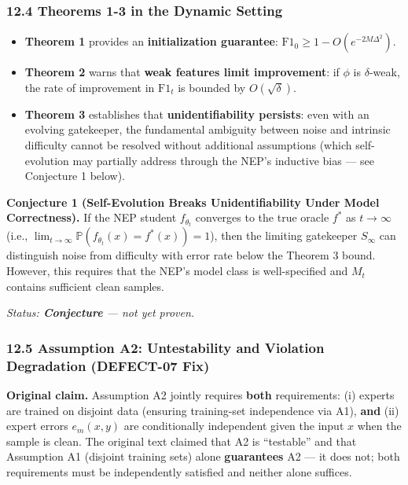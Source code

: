 \documentclass[
  12pt,
]{article}
\providecommand{\tightlist}{%
  \setlength{\itemsep}{0pt}\setlength{\parskip}{0pt}}
\begin{document}
\subsubsection{12.4 Theorems 1-3 in the Dynamic
Setting}\label{theorems-1-3-in-the-dynamic-setting}

\begin{itemize}
\tightlist
\item
  \textbf{Theorem 1} provides an \textbf{initialization guarantee}:
  \(\text{F1}_0 \geq 1 - O(e^{-2M\Delta^2})\).
\item
  \textbf{Theorem 2} warns that \textbf{weak features limit
  improvement}: if \(\phi\) is \(\delta\)-weak, the rate of improvement
  in \(\text{F1}_t\) is bounded by \(O(\sqrt{\delta})\).
\item
  \textbf{Theorem 3} establishes that \textbf{unidentifiability
  persists}: even with an evolving gatekeeper, the fundamental ambiguity
  between noise and intrinsic difficulty cannot be resolved without
  additional assumptions (which self-evolution may partially address
  through the NEP's inductive bias --- see Conjecture 1 below).
\end{itemize}

\textbf{Conjecture 1 (Self-Evolution Breaks Unidentifiability Under
Model Correctness).} If the NEP student \(f_{\theta_t}\) converges to
the true oracle \(f^*\) as \(t \to \infty\) (i.e.,
\(\lim_{t\to\infty} \mathbb{P}(f_{\theta_t}(x) = f^*(x)) = 1\)), then
the limiting gatekeeper \(S_\infty\) can distinguish noise from
difficulty with error rate below the Theorem 3 bound. However, this
requires that the NEP's model class is well-specified and \(M_t\)
contains sufficient clean samples.

\emph{Status: \textbf{Conjecture} --- not yet proven.}

\subsubsection{12.5 Assumption A2: Untestability and Violation
Degradation (DEFECT-07
Fix)}\label{assumption-a2-untestability-and-violation-degradation-defect-07-fix}

\textbf{Original claim.} Assumption A2 jointly requires \textbf{both}
requirements: (i) experts are trained on disjoint data (ensuring
training-set independence via A1), \textbf{and} (ii) expert errors
\(e_m(x, y)\) are conditionally independent given the input \(x\) when
the sample is clean. The original text claimed that A2 is ``testable'' and that Assumption A1 (disjoint training sets) alone
\textbf{guarantees} A2 --- it does not; both requirements must be
independently satisfied and neither alone suffices.
\end{document}

